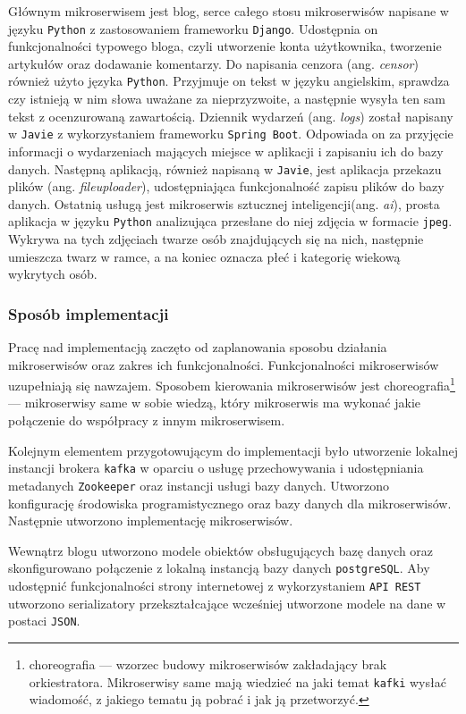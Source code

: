 \documentclass[12pt,twoside]{article}
\begin{document}
Głównym mikroserwisem jest blog, serce całego stosu mikroserwisów napisane w języku \texttt{Python} z zastosowaniem frameworku \texttt{Django}. Udostępnia on funkcjonalności typowego bloga, czyli utworzenie konta użytkownika, tworzenie artykułów oraz dodawanie komentarzy. Do napisania cenzora (ang. \textit{censor}) również użyto języka \texttt{Python}. Przyjmuje on tekst w języku angielskim, sprawdza czy istnieją w nim słowa uważane za nieprzyzwoite, a następnie wysyła ten sam tekst z ocenzurowaną zawartością. Dziennik wydarzeń (ang. \textit{logs}) został napisany w \texttt{Javie} z wykorzystaniem frameworku \texttt{Spring Boot}. Odpowiada on za przyjęcie informacji o wydarzeniach mających miejsce w aplikacji i zapisaniu ich do bazy danych. Następną aplikacją, również napisaną w \texttt{Javie}, jest aplikacja przekazu plików (ang. \textit{fileuploader}), udostępniająca funkcjonalność zapisu plików do bazy danych. Ostatnią usługą jest mikroserwis sztucznej inteligencji(ang. \textit{ai}), prosta aplikacja w języku \texttt{Python} analizująca przesłane do niej zdjęcia w formacie \texttt{jpeg}. Wykrywa na tych zdjęciach twarze osób znajdujących się na nich, następnie umieszcza twarz w ramce, a na koniec oznacza płeć i kategorię wiekową wykrytych osób.

\subsubsection{Sposób implementacji}

Pracę nad implementacją zaczęto od zaplanowania sposobu działania mikroserwisów oraz zakres ich funkcjonalności.
Funkcjonalności mikroserwisów uzupełniają się nawzajem. Sposobem kierowania mikroserwisów jest choreografia\footnote{choreografia — wzorzec budowy mikroserwisów zakładający brak orkiestratora. Mikroserwisy same mają wiedzieć na jaki temat \texttt{kafki} wysłać wiadomość, z jakiego tematu ją pobrać i jak ją przetworzyć\cite{eventDrivenMicroservices}.} — mikroserwisy same w sobie wiedzą, który mikroserwis ma wykonać jakie połączenie do współpracy z innym mikroserwisem.

Kolejnym elementem przygotowującym do implementacji było utworzenie lokalnej instancji brokera \texttt{kafka} w oparciu o usługę przechowywania i udostępniania metadanych \texttt{Zookeeper} oraz instancji usługi bazy danych. Utworzono konfigurację środowiska programistycznego oraz bazy danych dla mikroserwisów. Następnie utworzono implementację mikroserwisów.

Wewnątrz blogu utworzono modele obiektów obsługujących bazę danych oraz skonfigurowano połączenie z lokalną instancją bazy danych \texttt{postgreSQL}. Aby udostępnić funkcjonalności strony internetowej z wykorzystaniem \texttt{API REST} utworzono serializatory przekształcające wcześniej utworzone modele na dane w postaci \texttt{JSON}.
\end{document}
